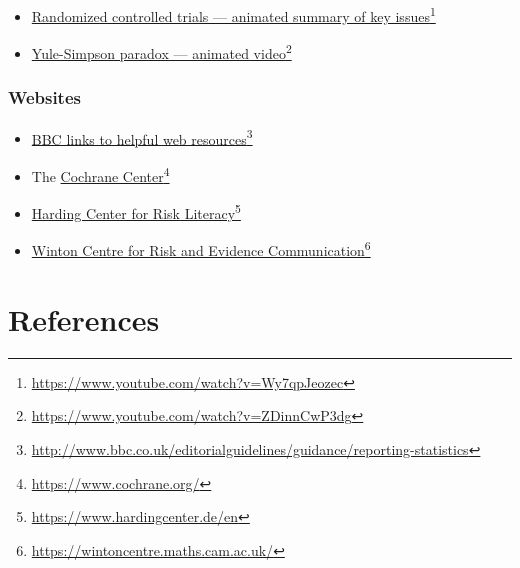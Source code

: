 \documentclass[
  10ptls,
  b5paper]{book}
\providecommand{\tightlist}{%
  \setlength{\itemsep}{0pt}\setlength{\parskip}{0pt}}
\begin{document}
\begin{itemize}
\tightlist
\item
  \href{https://www.youtube.com/watch?v=Wy7qpJeozec}{Randomized controlled trials --- animated summary of key issues}\footnote{\url{https://www.youtube.com/watch?v=Wy7qpJeozec}}
\item
  \href{https://www.youtube.com/watch?v=ZDinnCwP3dg}{Yule-Simpson paradox --- animated video}\footnote{\url{https://www.youtube.com/watch?v=ZDinnCwP3dg}}
\end{itemize}

\subsection*{Websites}\label{websites}

\begin{itemize}
\tightlist
\item
  \href{http://www.bbc.co.uk/editorialguidelines/guidance/reporting-statistics}{BBC links to helpful web resources}\footnote{\url{http://www.bbc.co.uk/editorialguidelines/guidance/reporting-statistics}}
\item
  The \href{https://www.cochrane.org/}{Cochrane Center}\footnote{\url{https://www.cochrane.org/}}
\item
  \href{https://www.hardingcenter.de/en}{Harding Center for Risk Literacy}\footnote{\url{https://www.hardingcenter.de/en}}
\item
  \href{https://wintoncentre.maths.cam.ac.uk/}{Winton Centre for Risk and Evidence Communication}\footnote{\url{https://wintoncentre.maths.cam.ac.uk/}}
\end{itemize}

\chapter*{References}\label{references}
\end{document}
